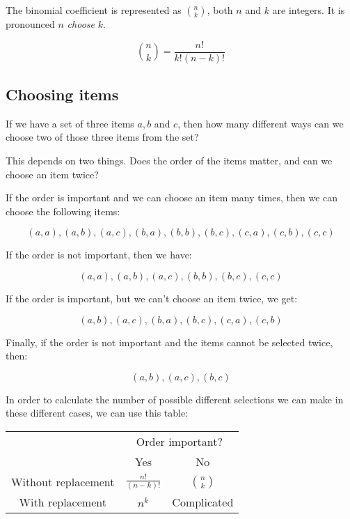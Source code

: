 The binomial coefficient is represented as $n \choose k$, both $n$ and $k$ are
integers. It is pronounced $n$ {\it choose} $k$.

\begin{dmath}
	{n \choose k} = \frac{n!}{k!(n-k)!}
\end{dmath}

\subsection{Choosing items}

If we have a set of three items $a, b$ and $c$, then how many different ways can
we choose two of those three items from the set?

This depends on two things. Does the order of the items matter, and can we
choose an item twice?

If the order is important and we can choose an item many times, then we can
choose the following items:

\begin{dmath}
	(a,a), (a,b), (a,c), (b,a), (b,b), (b,c), (c,a), (c,b), (c,c)
\end{dmath}

If the order is not important, then we have:

\begin{dmath}
	(a,a), (a,b), (a,c), (b,b), (b,c), (c,c)
\end{dmath}

If the order is important, but we can't choose an item twice, we get:

\begin{dmath}
	(a,b), (a,c), (b,a), (b,c), (c,a), (c,b)
\end{dmath}

Finally, if the order is not important and the items cannot be selected twice,
then:

\begin{dmath}
	(a,b), (a,c), (b,c)
\end{dmath}

In order to calculate the number of possible different selections we can make in
these different cases, we can use this table:

\begin{center}
\begin{tabular}{|c|c|c|}
	\hline
	& \multicolumn{2}{c|}{Order important?}\\
	\cline{2-3}
	& Yes & No\\ \hline
	Without replacement & $\frac{n!}{(n-k)!}$ & $n \choose k$\\ \hline
	With replacement & $n^k$ & Complicated\\ \hline
\end{tabular}
\end{center}

